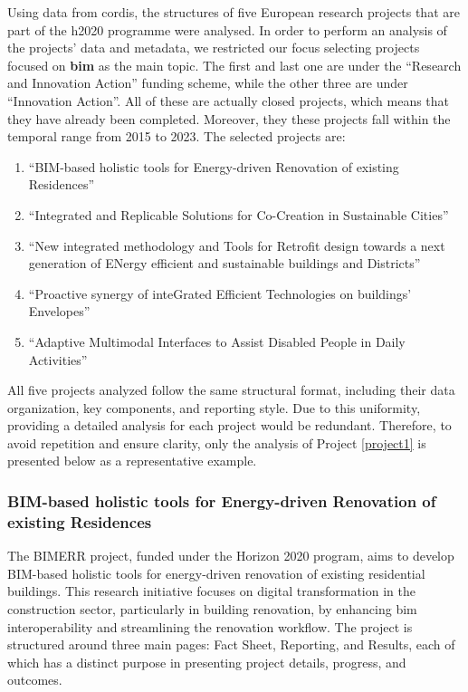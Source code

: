Using data from \gls{cordis}, the structures of five European research projects that are part of the \gls{h2020} programme were analysed.
In order to perform an analysis of the projects' data and metadata, we restricted our focus selecting projects focused on \textbf{\gls{bim}} as the main topic.
The first and last one are under the ``Research and Innovation Action'' funding scheme, while the other three are under ``Innovation Action''.
All of these are actually closed projects, which means that they have already been completed.
Moreover, they these projects fall within the temporal range from 2015 to 2023.
The selected projects are:
\begin{enumerate}
    \item ``BIM-based holistic tools for Energy-driven Renovation of existing Residences''\label{project1}
    \item ``Integrated and Replicable Solutions for Co-Creation in Sustainable Cities''
    \item ``New integrated methodology and Tools for Retrofit design towards a next generation of ENergy efficient and sustainable buildings and Districts''
    \item ``Proactive synergy of inteGrated Efficient Technologies on buildings' Envelopes''
    \item ``Adaptive Multimodal Interfaces to Assist Disabled People in Daily Activities'' 
\end{enumerate}

All five projects analyzed follow the same structural format, including their data organization, key components, and reporting style.
Due to this uniformity, providing a detailed analysis for each project would be redundant.
Therefore, to avoid repetition and ensure clarity, only the analysis of Project \ref{project1} is presented below as a representative example.

\subsubsection*{BIM-based holistic tools for Energy-driven Renovation of existing Residences}

The BIMERR project, funded under the Horizon 2020 program, aims to develop BIM-based holistic tools for energy-driven renovation of existing residential buildings.
This research initiative focuses on digital transformation in the construction sector, particularly in building renovation, by enhancing \gls{bim} interoperability and streamlining the renovation workflow.
The project is structured around three main pages: Fact Sheet, Reporting, and Results, each of which has a distinct purpose in presenting project details, progress, and outcomes.

